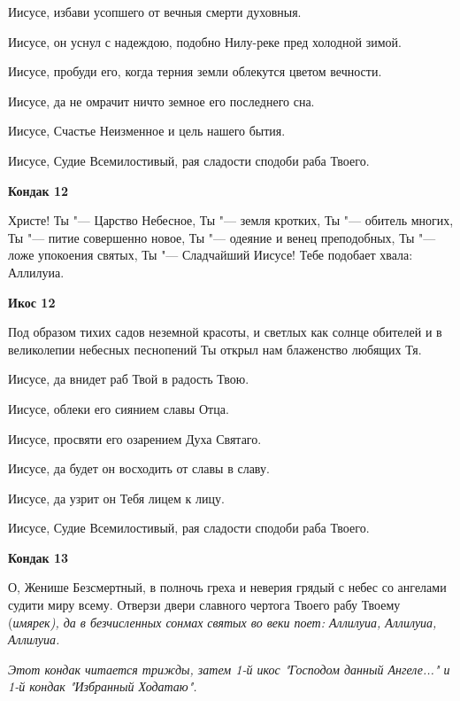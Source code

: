 Иисусе, избави усопшего от вечныя смерти духовныя. 

Иисусе, он уснул с надеждою, подобно Нилу-реке пред холодной зимой. 

Иисусе, пробуди его, когда терния земли облекутся цветом вечности. 

Иисусе, да не омрачит ничто земное его последнего сна. 

Иисусе, Счастье Неизменное и цель нашего бытия. 

Иисусе, Судие Всемилостивый, рая сладости сподоби раба Твоего.


\medskip


\bfseries Кондак 12\normalfont{}


Христе! Ты "--- Царство Небесное, Ты "--- земля кротких, Ты "--- обитель многих, Ты "--- питие совершенно новое, Ты "--- одеяние и венец преподобных, Ты "--- ложе упокоения святых, Ты "--- Сладчайший Иисусе! Тебе подобает хвала: Аллилуиа.


\medskip


\bfseries Икос 12\normalfont{}


Под образом тихих садов неземной красоты, и светлых как солнце обителей и в великолепии небесных песнопений Ты открыл нам блаженство любящих Тя. 

Иисусе, да внидет раб Твой в радость Твою. 

Иисусе, облеки его сиянием славы Отца. 

Иисусе, просвяти его озарением Духа Святаго. 

Иисусе, да будет он восходить от славы в славу. 

Иисусе, да узрит он Тебя лицем к лицу. 

Иисусе, Судие Всемилостивый, рая сладости сподоби раба Твоего.


\medskip


\bfseries Кондак 13\normalfont{}


О, Женише Безсмертный, в полночь греха и неверия грядый с небес со ангелами судити миру всему. Отверзи двери славного чертога Твоего рабу Твоему (\itshape имярек\normalfont{}), да в безчисленных сонмах святых во веки поет: Аллилуиа, Аллилуиа, Аллилуиа. 

\itshape Этот кондак читается трижды, затем 1-й икос "Господом данный Ангеле..." и 1-й кондак "Избранный Ходатаю".\normalfont{}


\mychapterending

 


